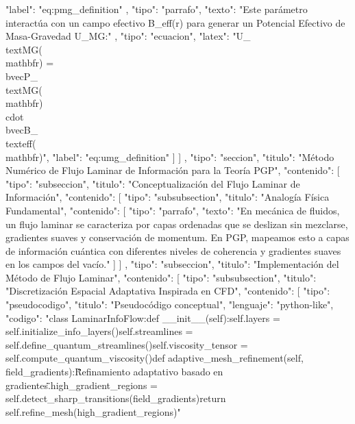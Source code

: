 \documentclass{article}
\begin{document}
{{{{              "label": "eq:pmg_definition"
            },
            {
              "tipo": "parrafo",
              "texto": "Este parámetro interactúa con un campo efectivo B_eff(r) para generar un Potencial Efectivo de Masa-Gravedad U_MG:"
            },
            {
              "tipo": "ecuacion",
              "latex": "U_{\\text{MG}}(\\mathbf{r}) = \\bvec{P}_{\\text{MG}}(\\mathbf{r}) \\cdot \\bvec{B}_{\\text{eff}}(\\mathbf{r})",
              "label": "eq:umg_definition"
            }
          ]
        }
      ]
    },
    {
      "tipo": "seccion",
      "titulo": "Método Numérico de Flujo Laminar de Información para la Teoría PGP",
      "contenido": [
        {
          "tipo": "subseccion",
          "titulo": "Conceptualización del Flujo Laminar de Información",
          "contenido": [
            {
              "tipo": "subsubsection",
              "titulo": "Analogía Física Fundamental",
              "contenido": [
                {
                  "tipo": "parrafo",
                  "texto": "En mecánica de fluidos, un flujo laminar se caracteriza por capas ordenadas que se deslizan sin mezclarse, gradientes suaves y conservación de momentum. En PGP, mapeamos esto a capas de información cuántica con diferentes niveles de coherencia y gradientes suaves en los campos del vacío."
                }
              ]
            }
          ]
        },
        {
          "tipo": "subseccion",
          "titulo": "Implementación del Método de Flujo Laminar",
          "contenido": [
            {
              "tipo": "subsubsection",
              "titulo": "Discretización Espacial Adaptativa Inspirada en CFD",
              "contenido": [
                {
                  "tipo": "pseudocodigo",
                  "titulo": "Pseudocódigo conceptual",
                  "lenguaje": "python-like",
                  "codigo": "class LaminarInfoFlow:\n    def __init__(self):\n        self.layers = self.initialize_info_layers()\n        self.streamlines = self.define_quantum_streamlines()\n        self.viscosity_tensor = self.compute_quantum_viscosity()\n\n    def adaptive_mesh_refinement(self, field_gradients):\n        \"\"\"Refinamiento adaptativo basado en gradientes.\"\"\"\n        high_gradient_regions = self.detect_sharp_transitions(field_gradients)\n        return self.refine_mesh(high_gradient_regions)"
}}}}}
\end{document}
